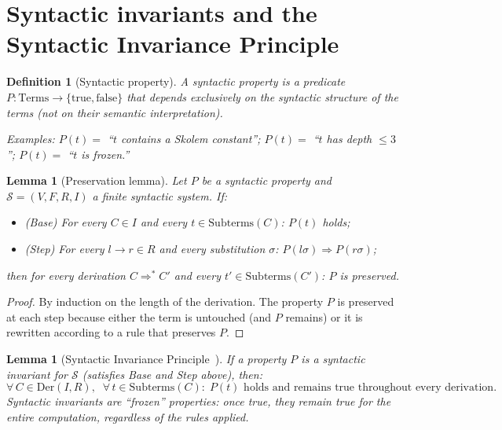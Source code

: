 \documentclass[11pt]{article}
\newtheorem{lemma}[theorem]{Lemma}
\newtheorem{definition}[theorem]{Definition}
\begin{document}
\section{Syntactic invariants and the Syntactic Invariance Principle}
\label{sec:sip}


\begin{definition}[Syntactic property]
\label{def:syntactic-property}
A \emph{syntactic property} is a predicate
$P : \mathrm{Terms} \to \{\mathrm{true}, \mathrm{false}\}$ that depends
exclusively on the syntactic structure of the terms (not on their
semantic interpretation).

Examples: $P(t) = $ ``$t$ contains a Skolem constant'';
$P(t) = $ ``$t$ has depth $\leq 3$'';
$P(t) = $ ``$t$ is frozen.''
\end{definition}

\begin{lemma}[Preservation lemma]
\label{lem:preservation}
Let $P$ be a syntactic property and
$\mathcal{S} = (V, F, R, I)$ a finite syntactic system. If:
\begin{itemize}
  \item (Base) For every $C \in I$ and every
        $t \in \mathrm{Subterms}(C)$: $P(t)$ holds;
  \item (Step) For every $l \to r \in R$ and every substitution
        $\sigma$: $P(l\sigma) \Rightarrow P(r\sigma)$;
\end{itemize}
then for every derivation $C \Rightarrow^* C'$ and every
$t' \in \mathrm{Subterms}(C')$: $P$ is preserved.
\end{lemma}

\begin{proof}
By induction on the length of the derivation. The property $P$ is
preserved at each step because either the term is untouched (and $P$
remains) or it is rewritten according to a rule that preserves $P$.
\end{proof}

\begin{lemma}[Syntactic Invariance Principle~{\cite[Lemma~5]{buono2026sip}}]
\label{lem:sip}
If a property $P$ is a syntactic invariant for $\mathcal{S}$ (satisfies
Base and Step above), then:
\[
  \forall\, C \in \mathrm{Der}(I,R),\;\;
  \forall\, t \in \mathrm{Subterms}(C):\;
  P(t) \text{ holds and remains true throughout every derivation.}
\]
Syntactic invariants are ``frozen'' properties: once true, they remain
true for the entire computation, regardless of the rules applied.
\end{lemma}
\end{document}
